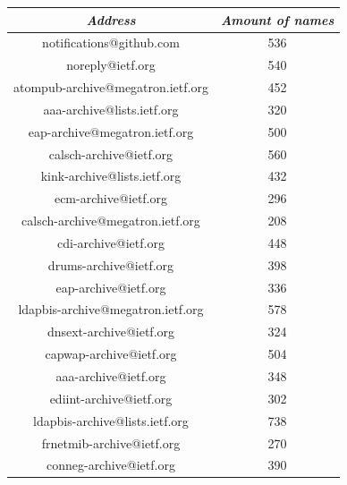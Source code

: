 \documentclass[a4paper,english]{report}
\begin{document}
\begin{center}
 \begin{tabular}{||c | c||} 
 \hline
 \textit{Address} & \textit{Amount of names} \\ [1ex] 
 \hline\hline

notifications@github.com & 536\\
\hline

noreply@ietf.org & 540\\
\hline

atompub-archive@megatron.ietf.org & 452\\
\hline

aaa-archive@lists.ietf.org & 320\\
\hline

eap-archive@megatron.ietf.org & 500\\
\hline

calsch-archive@ietf.org & 560\\
\hline

kink-archive@lists.ietf.org & 432\\
\hline

ecm-archive@ietf.org & 296\\
\hline

calsch-archive@megatron.ietf.org & 208\\
\hline

cdi-archive@ietf.org & 448\\
\hline

drums-archive@ietf.org & 398\\
\hline

eap-archive@ietf.org & 336\\
\hline

ldapbis-archive@megatron.ietf.org & 578\\
\hline

dnsext-archive@ietf.org & 324\\
\hline

capwap-archive@ietf.org & 504\\
\hline

aaa-archive@ietf.org & 348\\
\hline

ediint-archive@ietf.org & 302\\
\hline

ldapbis-archive@lists.ietf.org & 738\\
\hline

frnetmib-archive@ietf.org & 270\\
\hline

conneg-archive@ietf.org & 390\\
\hline


\end{tabular}
\end{center}
\end{document}
